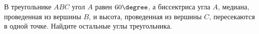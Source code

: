 \begin{ex}
	\begin{condition}
		В треугольнике \( ABC  \) угол \( A \) равен \( 60\degree\), а биссектриса угла \( A \), медиана, проведенная из вершины \( B \), и высота, проведенная из вершины \( C \), пересекаются в одной точке. Найдите остальные углы треугольника.
	\end{condition}
\end{ex}
